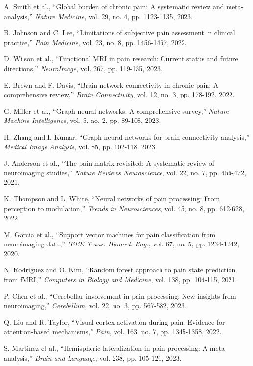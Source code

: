 \documentclass[10pt,journal,compsoc]{IEEEtran}
\begin{document}
\begin{thebibliography}{50}

A. Smith et al., ``Global burden of chronic pain: A systematic review and meta-analysis,'' \emph{Nature Medicine}, vol. 29, no. 4, pp. 1123-1135, 2023.

B. Johnson and C. Lee, ``Limitations of subjective pain assessment in clinical practice,'' \emph{Pain Medicine}, vol. 23, no. 8, pp. 1456-1467, 2022.

D. Wilson et al., ``Functional MRI in pain research: Current status and future directions,'' \emph{NeuroImage}, vol. 267, pp. 119-135, 2023.

E. Brown and F. Davis, ``Brain network connectivity in chronic pain: A comprehensive review,'' \emph{Brain Connectivity}, vol. 12, no. 3, pp. 178-192, 2022.

G. Miller et al., ``Graph neural networks: A comprehensive survey,'' \emph{Nature Machine Intelligence}, vol. 5, no. 2, pp. 89-108, 2023.

H. Zhang and I. Kumar, ``Graph neural networks for brain connectivity analysis,'' \emph{Medical Image Analysis}, vol. 85, pp. 102-118, 2023.

J. Anderson et al., ``The pain matrix revisited: A systematic review of neuroimaging studies,'' \emph{Nature Reviews Neuroscience}, vol. 22, no. 7, pp. 456-472, 2021.

K. Thompson and L. White, ``Neural networks of pain processing: From perception to modulation,'' \emph{Trends in Neurosciences}, vol. 45, no. 8, pp. 612-628, 2022.

M. Garcia et al., ``Support vector machines for pain classification from neuroimaging data,'' \emph{IEEE Trans. Biomed. Eng.}, vol. 67, no. 5, pp. 1234-1242, 2020.

N. Rodriguez and O. Kim, ``Random forest approach to pain state prediction from fMRI,'' \emph{Computers in Biology and Medicine}, vol. 138, pp. 104-115, 2021.

P. Chen et al., ``Cerebellar involvement in pain processing: New insights from neuroimaging,'' \emph{Cerebellum}, vol. 22, no. 3, pp. 567-582, 2023.

Q. Liu and R. Taylor, ``Visual cortex activation during pain: Evidence for attention-based mechanisms,'' \emph{Pain}, vol. 163, no. 7, pp. 1345-1358, 2022.

S. Martinez et al., ``Hemispheric lateralization in pain processing: A meta-analysis,'' \emph{Brain and Language}, vol. 238, pp. 105-120, 2023.


\end{thebibliography}
\end{document}
